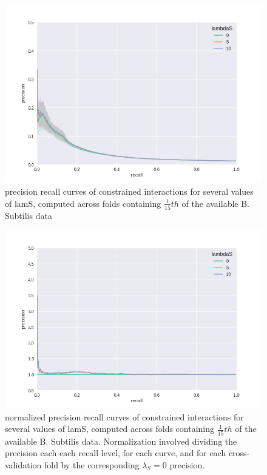 \documentclass[11pt]{article}
\begin{document}
\begin{figure}
\begin{center}
  \includegraphics[scale=0.45]{waka7unnormed.png}
  \caption{\label{fig:figure1} precision recall curves of constrained interactions for several values of lamS, computed across folds containing $\frac{1}{15}th$ of the available B. Subtilis data}
  \end{center}
\end{figure}

\begin{figure}
\begin{center}
  \includegraphics[scale=0.45]{woko7.png}
  \caption{\label{fig:figure1} normalized precision recall curves of constrained interactions for several values of lamS, computed across folds containing $\frac{1}{15}th$ of the available B. Subtilis data. Normalization involved dividing the precision each each recall level, for each curve, and for each cross-validation fold by the corresponding $\lambda_S=0$ precision.}
  \end{center}
\end{figure}
\end{document}
